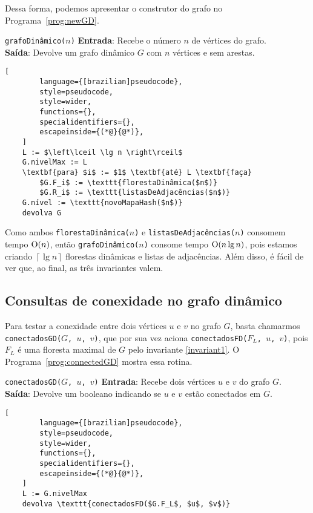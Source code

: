 Dessa forma, podemos apresentar o construtor do grafo no Programa~\ref{prog:newGD}. 

\begin{programruledcaption}{\texttt{grafoDinâmico($n$)} \label{prog:newGD}}
    \noindent\textbf{Entrada}: Recebe o número $n$ de vértices do grafo. \\
    \textbf{Saída}: Devolve um grafo dinâmico $G$ com $n$ vértices e sem arestas.
    \vspace{-0.5\baselineskip}
    \begin{lstlisting}[
        language={[brazilian]pseudocode},
        style=pseudocode,
        style=wider,
        functions={},
        specialidentifiers={},
        escapeinside={(*@}{@*)},
    ]
    L := $\left\lceil \lg n \right\rceil$
    G.nivelMax := L
    \textbf{para} $i$ := $1$ \textbf{até} L \textbf{faça}
        $G.F_i$ := \texttt{florestaDinâmica($n$)}
        $G.R_i$ := \texttt{listasDeAdjacências($n$)}
    G.nível := \texttt{novoMapaHash($n$)}
    devolva G
    \end{lstlisting}
    \vspace{-0.5\baselineskip}
\end{programruledcaption}

Como ambos \texttt{florestaDinâmica($n$)} e \texttt{listasDeAdjacências($n$)} consomem tempo $\mathrm{O}(n)$, então \texttt{grafoDinâmico($n$)} consome tempo $\mathrm{O}(n \lg n)$, pois estamos criando $\left\lceil \lg n \right\rceil$ florestas dinâmicas e listas de adjacências. Além disso, é fácil de ver que, ao final, as três invariantes valem.

\subsection{Consultas de conexidade no grafo dinâmico}
\label{sec:dynamic-graph-connectivity-queries}

Para testar a conexidade entre dois vértices $u$ e $v$ no grafo $G$, basta chamarmos \texttt{conectadosGD($G$, $u$, $v$)}, que por sua vez aciona \texttt{conectadosFD($F_L$, $u$, $v$)}, pois $F_L$ é uma floresta maximal de $G$ pelo invariante \ref{invariant1}. O Programa~\ref{prog:connectedGD} mostra essa rotina.

\begin{programruledcaption}{\texttt{conectadosGD($G$, $u$, $v$)} \label{prog:connectedGD}}
    \noindent\textbf{Entrada}: Recebe dois vértices $u$ e $v$ do grafo $G$. \\
    \textbf{Saída}: Devolve um booleano indicando se $u$ e $v$ estão conectados em $G$.
    \vspace{-0.5\baselineskip}
    \begin{lstlisting}[
        language={[brazilian]pseudocode},
        style=pseudocode,
        style=wider,
        functions={},
        specialidentifiers={},
        escapeinside={(*@}{@*)},
    ]
    L := G.nivelMax
    devolva \texttt{conectadosFD($G.F_L$, $u$, $v$)}
    \end{lstlisting}
    \vspace{-0.5\baselineskip}
\end{programruledcaption}

